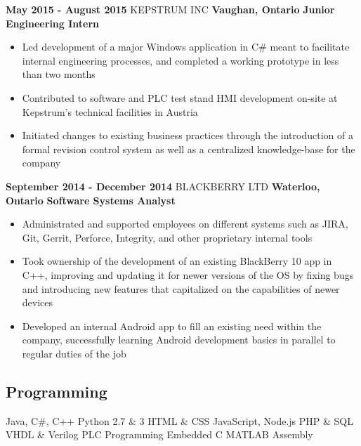 \documentclass[hidelinks]{kkurucz-cv}
\begin{document}
\begin{minipage}{\textwidth}
\begin{entrylist}
\entry
{\textbf{May 2015 - August 2015}}
{KEPSTRUM INC}
{\textbf{Vaughan, Ontario}}
{\textbf{Junior Engineering Intern}}
{
\begin{itemize}
	\item Led development of a major Windows application in C\# meant to facilitate internal engineering processes, and completed a working prototype in less than two months
	\item Contributed to software and PLC test stand HMI development on-site at Kepstrum’s technical facilities in Austria
	\item Initiated changes to existing business practices through the introduction of a formal revision control system as well as a centralized knowledge-base for the company
\end{itemize}
}

\entry
{\textbf{September 2014 - December 2014}}
{BLACKBERRY LTD}
{\textbf{Waterloo, Ontario}}
{\textbf{Software Systems Analyst}}
{
\begin{itemize}
	\item Administrated and supported employees on different systems such as JIRA, Git, Gerrit, Perforce, Integrity, and other proprietary internal tools
	\item Took ownership of the development of an existing BlackBerry 10 app in C++, improving and updating it for newer versions of the OS by fixing bugs and introducing new features that capitalized on the capabilities of newer devices 
	\item Developed an internal Android app to fill an existing need within the company, successfully learning Android development basics in parallel to regular duties of the job
\end{itemize}
}
\end{entrylist}
\end{minipage}

\newpage

\begin{aside2}
\section{Programming}
Java, C\#, C++
Python 2.7 \& 3
HTML \& CSS
JavaScript, Node.js
PHP \& SQL
VHDL \& Verilog
PLC Programming
Embedded C
MATLAB
Assembly
\end{aside2}
\end{document}
